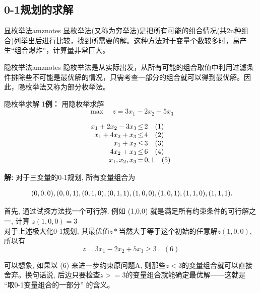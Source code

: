     \subsection{0-1规划的求解}
    \begin{dfnbox}{显枚举法}{amznotes}
        显枚举法(又称为穷举法)是把所有可能的组合情况(共2n种组合)列举出后进行比较，找到所需要的解。这种方法对于变量个数较多时，易产生“组合爆炸”，计算量非常巨大。
    \end{dfnbox}
    \begin{dfnbox}{隐枚举法}{amznotes}
        隐枚举法是从实际出发，从所有可能的组合取值中利用过滤条件排除些不可能是最优解的情况，只需考查一部分的组合就可以得到最优解。因此，隐枚举法又称为部分枚举法。
    \end{dfnbox}
    \begin{exbox}{隐枚举求解}
        1\textbf{例：} 用隐枚举求解
        \[
        \max \quad z = 3x_1 - 2x_2 + 5x_3
        \]

        \[
        \begin{array}{r@{\,}c@{\,}l}
        x_1 + 2x_2 - 3x_3 & \leq & 2 \quad (1) \\
        x_1 + 4x_2 + x_3 & \leq & 4 \quad (2) \\
        x_1 + x_2 & \leq & 3 \quad (3) \\
        4x_2 + x_3 & \leq & 6 \quad (4) \\
        x_1, x_2, x_3 & = & 0, 1 \quad (5)
        \end{array}
        \]

        \textbf{解:} 对于三变量的0-1规划, 所有变量组合为

        \[
        \begin{array}{c@{\,}c@{\,}c@{\,}c@{\,}c@{\,}c@{\,}c@{\,}c@{\,}c@{\,}c}
        (0,0,0), & (0,0,1), & (0,1,0), & (0,1,1), & (1,0,0), & (1,0,1), & (1,1,0), & (1,1,1).
        \end{array}
        \]

        首先, 通过试探方法找一个可行解, 例如 (1,0,0) 就是满足所有约束条件的可行解之一, 计算 $z(1,0,0)=3$\\

        对于上述极大化0-1规划, 其最优值$z*$当然大于等于这个初始的任意解$z(1,0,0)$, 所以有
        \[
        z = 3x_1 - 2x_2 + 5x_3 \geq 3 \quad (6)
        \]

        可以想象, 如果以 (6) 来进一步约束原问题A, 则那些$z<3$的变量组合就可以直接舍弃。换句话说, 后边只要检查$z>=3$的变量组合就能确定最优解——这就是 “取0-1变量组合的一部分” 的含义。


\end{exbox}
